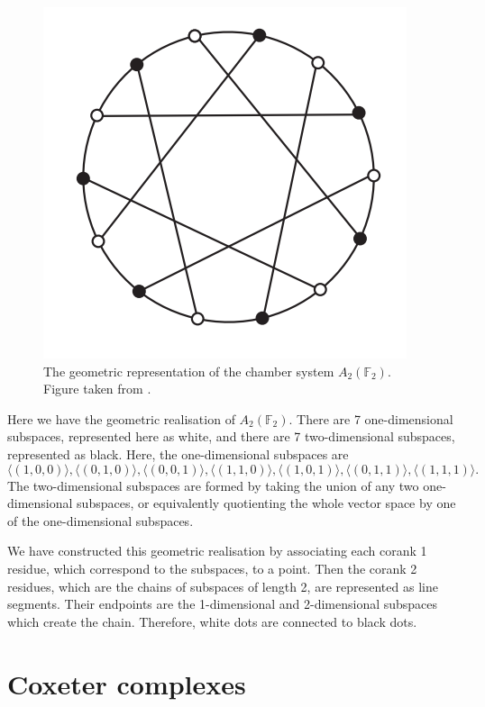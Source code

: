 \documentclass[11pt]{article}
\begin{document}
\begin{figure}
    \centering
        \includegraphics[scale=0.5]{Screenshot 2023-03-16 131651.png}
        \caption{The geometric representation of the chamber system $A_2(\mathbb{F}_2)$. Figure taken from \cite[p.2]{EVERITT}.}
\end{figure}



\begin{example} \label{AnK}
    Here we have the geometric realisation of $A_2(\mathbb{F}_2)$. There are 7 one-dimensional subspaces, represented here as white, and there are 7 two-dimensional subspaces, represented as black. Here, the one-dimensional subspaces are
    \[\langle (1,0,0)\rangle, \langle (0,1,0)\rangle,\langle (0,0,1)\rangle,\langle (1,1,0)\rangle,\langle (1,0,1)\rangle,\langle (0,1,1)\rangle,\langle (1,1,1)\rangle.\]
    The two-dimensional subspaces are formed by taking the union of any two one-dimensional subspaces, or equivalently quotienting the whole vector space by one of the one-dimensional subspaces. 

    We have constructed this geometric realisation by associating each corank 1 residue, which correspond to the subspaces, to a point. Then the corank 2 residues, which are the chains of subspaces of length 2, are represented as line segments. Their endpoints are the 1-dimensional and 2-dimensional subspaces which create the chain. Therefore, white dots are connected to black dots.
\end{example}

\section{Coxeter complexes} \label{3}
\end{document}
